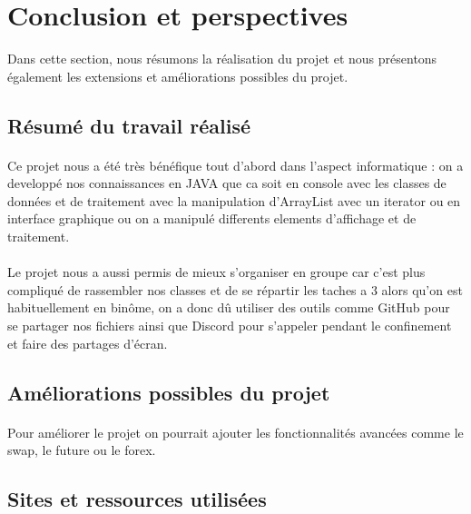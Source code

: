 \newpage
\section{Conclusion et perspectives}
\label{sec:conclusion}

\noindent Dans cette section, nous résumons la réalisation du projet et nous présentons également les extensions et améliorations possibles du projet.

\subsection{Résumé du travail réalisé}

\paragraph{}Ce projet nous a été très bénéfique tout d'abord dans l'aspect informatique : on a developpé nos connaissances en JAVA que ca soit en console avec les classes de données et de traitement avec la manipulation d'ArrayList avec un iterator ou en interface graphique ou on a manipulé differents elements d'affichage et de traitement.
\paragraph{}Le projet nous a aussi permis de mieux s'organiser en groupe car c'est plus compliqué de rassembler nos classes et de se répartir les taches a 3 alors qu'on est habituellement en binôme, on a donc dû utiliser des outils comme GitHub pour se partager nos fichiers ainsi que Discord pour s'appeler pendant le confinement et faire des partages d'écran.


\subsection{Améliorations possibles du projet}

\paragraph{}Pour améliorer le projet on pourrait ajouter les fonctionnalités avancées comme le swap, le future ou le forex.

\subsection{Sites et ressources utilisées}

